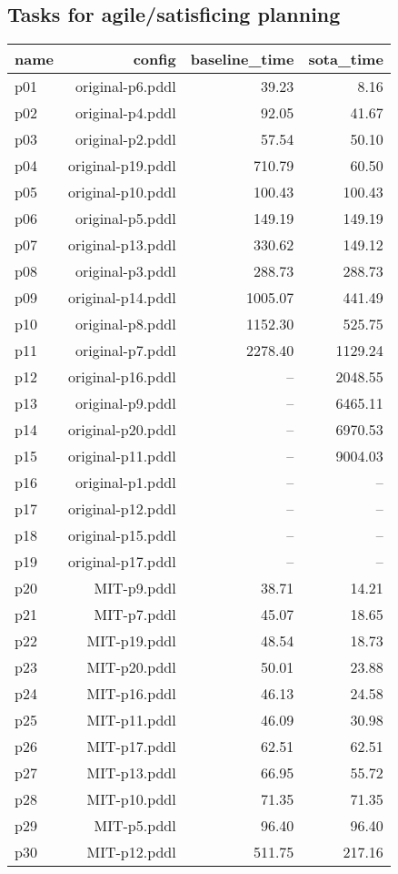 \documentclass{article}
\begin{document}
                    \subsection*{Tasks for agile/satisficing planning}
                    
                            \begin{center}
                            \scriptsize
                            \begin{tabular}{@{}l|r|r|r@{}}
                            name & config & baseline\_time & sota\_time\\\midrule
                              p01& original-p6.pddl&39.23&8.16\\
  p02& original-p4.pddl&92.05&41.67\\
  p03& original-p2.pddl&57.54&50.10\\
  p04& original-p19.pddl&710.79&60.50\\
  p05& original-p10.pddl&100.43&100.43\\
  p06& original-p5.pddl&149.19&149.19\\
  p07& original-p13.pddl&330.62&149.12\\
  p08& original-p3.pddl&288.73&288.73\\
  p09& original-p14.pddl&1005.07&441.49\\
  p10& original-p8.pddl&1152.30&525.75\\
  p11& original-p7.pddl&2278.40&1129.24\\
  p12& original-p16.pddl&--&2048.55\\
  p13& original-p9.pddl&--&6465.11\\
  p14& original-p20.pddl&--&6970.53\\
  p15& original-p11.pddl&--&9004.03\\
  p16& original-p1.pddl&--&--\\
  p17& original-p12.pddl&--&--\\
  p18& original-p15.pddl&--&--\\
  p19& original-p17.pddl&--&--\\
  p20& MIT-p9.pddl&38.71&14.21\\
  p21& MIT-p7.pddl&45.07&18.65\\
  p22& MIT-p19.pddl&48.54&18.73\\
  p23& MIT-p20.pddl&50.01&23.88\\
  p24& MIT-p16.pddl&46.13&24.58\\
  p25& MIT-p11.pddl&46.09&30.98\\
  p26& MIT-p17.pddl&62.51&62.51\\
  p27& MIT-p13.pddl&66.95&55.72\\
  p28& MIT-p10.pddl&71.35&71.35\\
  p29& MIT-p5.pddl&96.40&96.40\\
  p30& MIT-p12.pddl&511.75&217.16
                            \end{tabular}
                            \end{center}
                    
\end{document}
